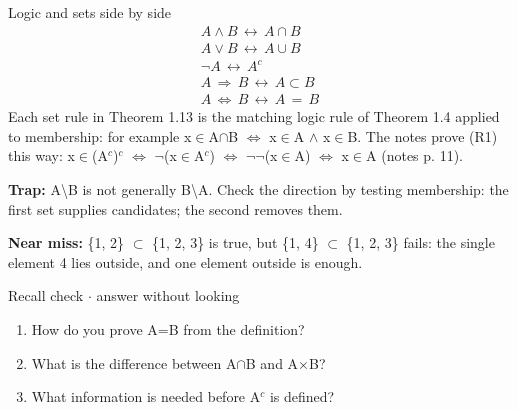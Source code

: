 \documentclass[11pt]{article}
\begin{document}
\begin{keepsection}
\begin{keepsection}
\begin{equationcard}{Logic and sets side by side}
\[ \begin{gathered} {A}\land {B}\, ↔\, {A}\cap {B} \\ {A}\lor {B}\, ↔\, {A}\cup {B} \\ \neg {A}\, ↔\, {A}^{c} \\ {A}\, \Rightarrow \, {B}\, ↔\, {A}\subset {B} \\ {A}\, \Leftrightarrow \, {B}\, ↔\, {A}\, =\, {B} \end{gathered} \]
{\small Each set rule in Theorem 1.13 is the matching logic rule of Theorem 1.4 applied to membership: for example x\ensuremath{\in}A\ensuremath{\cap}B \ensuremath{\Leftrightarrow} x\ensuremath{\in}A \ensuremath{\land} x\ensuremath{\in}B. The notes prove (R1) this way: x\ensuremath{\in}(A\ensuremath{^{c}})\ensuremath{^{c}} \ensuremath{\Leftrightarrow} \ensuremath{\neg}(x\ensuremath{\in}A\ensuremath{^{c}}) \ensuremath{\Leftrightarrow} \ensuremath{\neg}\ensuremath{\neg}(x\ensuremath{\in}A) \ensuremath{\Leftrightarrow} x\ensuremath{\in}A (notes p. 11).}
\end{equationcard}

\begin{notebox}\textbf{Trap:} A\textbackslash{}B is not generally B\textbackslash{}A. Check the direction by testing membership: the first set supplies candidates; the second removes them.\end{notebox}

\begin{notebox}\textbf{Near miss:} \{1, 2\} \ensuremath{\subset} \{1, 2, 3\} is true, but \{1, 4\} \ensuremath{\subset} \{1, 2, 3\} fails: the single element 4 lies outside, and one element outside is enough.\end{notebox}

\begin{recallbox}{Recall check \ensuremath{\cdot} answer without looking}
\begin{enumerate}
\item How do you prove A=B from the definition?
\item What is the difference between A\ensuremath{\cap}B and A\ensuremath{\times}B?
\item What information is needed before A\ensuremath{^{c}} is defined?
\end{enumerate}

\end{recallbox}
\end{keepsection}
\end{keepsection}
\end{document}

